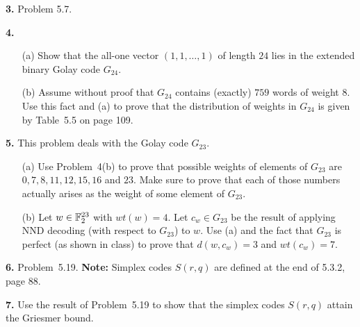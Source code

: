 \documentclass[12pt]{amsart}
\begin{document}
{\bf 3.} Problem 5.7. 
\skv

{\bf 4.}
\begin{itemize}
\item[(a)] Show that the all-one vector $(1, 1,\ldots , 1)$ of length $24$ lies in the extended binary Golay code $G_{24}$.
\item[(b)] Assume without proof that $G_{24}$ contains (exactly) $759$ words of weight $8$. Use this fact and (a) to prove that the distribution of weights in $G_{24}$ is given by Table~5.5 on page 109. 
\end{itemize}
\skv


{\bf 5.} This problem deals with the Golay code $G_{23}$.
\begin{itemize}
\item[(a)] Use Problem~4(b) to prove that possible weights of elements of $G_{23}$ are $0,7,8,11,12,15,16$ and $23$. Make sure to prove that each of those numbers actually arises as the weight of some element of $G_{23}$.
\item[(b)] Let $w\in {\mathbb F}_2^{23}$ with $wt(w)=4$. Let $c_{w}\in G_{23}$ be the result of applying NND decoding (with respect to $G_{23}$) to $w$.
Use (a) and the fact that $G_{23}$ is perfect (as shown in class) to prove that $d(w,c_w)=3$ and $wt(c_w)=7$. 
\end{itemize}
\skv

{\bf 6.} Problem~5.19. {\bf Note:} Simplex codes $S(r,q)$ are defined at the end of 5.3.2, page 88.
\skv

{\bf 7.} Use the result of Problem~5.19 to show that the simplex codes $S(r,q)$ attain the Griesmer bound.
\skv
\end{document}
